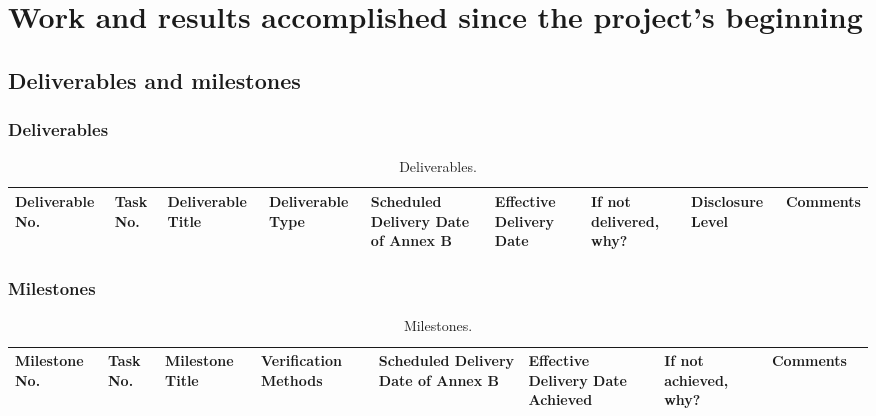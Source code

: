 \documentclass{ani-final}
\begin{document}
\chapter{Work and results accomplished since the project's beginning}
\lipsum[5-9]

  \section{Deliverables and milestones}
  \subsection{Deliverables}
  \lipsum[10-12]

  \newpage
  \begin{landscape}
    
    \begin{table}
      \centering
      \scriptsize
      \begin{tabular}{|p{}|p{}|p{}|p{}|p{}|p{}|p{}|p{}|p{}|}
        \hline
        Deliverable No. & Task No. & Deliverable Title & Deliverable Type & Scheduled Delivery Date of Annex B & Effective Delivery Date & If not delivered, why? & Disclosure Level & Comments \\ \hline
      \end{tabular}
      \caption{Deliverables.}
    \end{table}
  \end{landscape}
  
  \newpage
  \subsection{Milestones}
  \lipsum[10-12]

  \newpage
  \begin{landscape}
    \begin{table}
      \center
      \scriptsize
      \begin{tabular}{|p{}|p{}|p{}|p{}|p{}|p{}|p{}|p{}|p{}|}
        \hline
        Milestone No. & Task No. & Milestone Title & Verification Methods & Scheduled Delivery Date of Annex B & Effective Delivery Date Achieved & If not achieved, why? & Comments \\ \hline
      \end{tabular}
      \caption{Milestones.}
    \end{table}
  \end{landscape}
  \newpage
\end{document}
